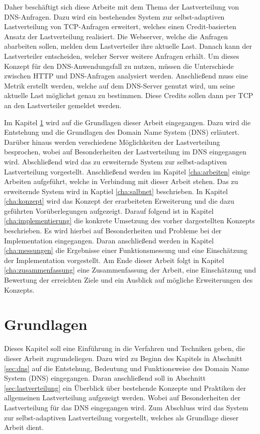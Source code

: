 \documentclass[a4paper, 12pt, BCOR10mm, DIV12, toc=bibliography, toc=listof, german]{scrbook}
\def \dns {Domain Name System (DNS)}
\begin{document}
		Daher beschäftigt sich diese Arbeite mit dem Thema der Lastverteilung von DNS-Anfragen. Dazu
		wird ein bestehendes System \cite{scsczile2008,zinke2012} zur selbst-adaptiven Lastverteilung von
		TCP-Anfragen erweitert, welches einen Credit-basierten Ansatz der Lastverteilung realisiert.
		Die Webserver, welche die Anfragen abarbeiten sollen, melden dem Lastverteiler ihre aktuelle
		Last.  Danach kann der Lastverteiler entscheiden, welcher Server weitere Anfragen erhält. Um
		dieses Konzept für den DNS-Anwendungsfall zu nutzen, müssen die Unterschiede zwischen HTTP und
		DNS-Anfragen analysiert werden. Anschließend muss eine Metrik erstellt werden, welche auf dem
		DNS-Server genutzt wird, um seine aktuelle Last möglichst genau zu bestimmen. Diese Credits
		sollen dann per TCP an den Lastverteiler gemeldet werden.

		Im Kapitel \ref{cha:grundlagen} wird auf die Grundlagen dieser Arbeit eingegangen. Dazu wird die
		Entstehung und die Grundlagen des \dns{} erläutert. Darüber hinaus werden verschiedene
		Möglichkeiten der Lastverteilung besprochen, wobei auf Besonderheiten der Lastverteilung im DNS
		eingegangen wird. Abschließend wird das zu erweiternde System zur selbst-adaptiven
		Lastverteilung vorgestellt. Anschließend werden im Kapitel \ref{cha:arbeiten} einige Arbeiten
		aufgeführt, welche in Verbindung mit dieser Arbeit stehen. Das zu erweiternde System wird in
		Kaptiel \ref{cha:salbnet} beschrieben. In Kapitel \ref{cha:konzept} wird das Konzept der
		erarbeiteten Erweiterung und die dazu geführten Vorüberlegungen aufgezeigt.  Darauf folgend ist
		in Kapitel \ref{cha:implementierung} die konkrete Umsetzung des vorher dargestellten Konzepts
		beschrieben. Es wird hierbei auf Besonderheiten und Probleme bei der Implementation eingegangen.
		Daran anschließend werden in Kapitel \ref{cha:messungen} die Ergebnisse einer Funktionsmessung
		und eine Einschätzung der Implementation vorgestellt. Am Ende dieser Arbeit folgt in Kapitel
		\ref{cha:zusammenfassung} eine Zusammenfassung der Arbeit, eine Einschätzung und Bewertung der
		erreichten Ziele und ein Ausblick auf mögliche Erweiterungen des Konzepts.


	\chapter{Grundlagen} %
	\label{cha:grundlagen}

		Dieses Kapitel soll eine Einführung in die Verfahren und Techniken geben, die dieser Arbeit
		zugrundeliegen.  Dazu wird zu Beginn des Kapitels in Abschnitt \ref{sec:dns} auf die Entstehung,
		Bedeutung und Funktionsweise des \dns{} eingegangen. Daran anschließend soll in Abschnitt
		\ref{sec:lastverteilung} ein Überblick über bestehende Konzepte und Praktiken der allgemeinen
		Lastverteilung aufgezeigt werden. Wobei auf Besonderheiten der Lastverteilung für das DNS
		eingegangen wird. Zum Abschluss wird das System zur selbst-adaptiven Lastverteilung vorgestellt,
		welches als Grundlage dieser Arbeit dient. 
\end{document}
